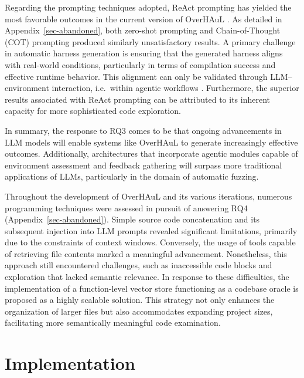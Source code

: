 \documentclass[
  a4paper,
  DIV=11,
  numbers=noendperiod]{scrreprt}
\theoremstyle{definition}
\theoremstyle{remark}
\begin{document}
Regarding the prompting techniques adopted, ReAct prompting has yielded
the most favorable outcomes in the current version of OverHAuL
\autocite{reAct}. As detailed in Appendix~\ref{sec-abandoned}, both
zero-shot prompting and Chain-of-Thought (COT) prompting
\autocite{chainofthought} produced similarly unsatisfactory results. A
primary challenge in automatic harness generation is ensuring that the
generated harness aligns with real-world conditions, particularly in
terms of compilation success and effective runtime behavior. This
alignment can only be validated through LLM--environment interaction,
i.e.~within agentic workflows \autocite{giannone2025}. Furthermore, the
superior results associated with ReAct prompting can be attributed to
its inherent capacity for more sophisticated code exploration.

In summary, the response to RQ3 comes to be that ongoing advancements in
LLM models will enable systems like OverHAuL to generate increasingly
effective outcomes. Additionally, architectures that incorporate agentic
modules capable of environment assessment and feedback gathering will
surpass more traditional applications of LLMs, particularly in the
domain of automatic fuzzing.

Throughout the development of OverHAuL and its various iterations,
numerous programming techniques were assessed in pursuit of answering
RQ4 (Appendix~\ref{sec-abandoned}). Simple source code concatenation and
its subsequent injection into LLM prompts revealed significant
limitations, primarily due to the constraints of context windows.
Conversely, the usage of tools capable of retrieving file contents
marked a meaningful advancement. Nonetheless, this approach still
encountered challenges, such as inaccessible code blocks and exploration
that lacked semantic relevance. In response to these difficulties, the
implementation of a function-level vector store functioning as a
codebase oracle is proposed as a highly scalable solution. This strategy
not only enhances the organization of larger files but also accommodates
expanding project sizes, facilitating more semantically meaningful code
examination.


\chapter{Implementation}\label{sec-implementation}
\end{document}
